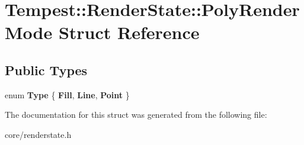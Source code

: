 \hypertarget{struct_tempest_1_1_render_state_1_1_poly_render_mode}{\section{Tempest\+:\+:Render\+State\+:\+:Poly\+Render\+Mode Struct Reference}
\label{struct_tempest_1_1_render_state_1_1_poly_render_mode}
}
\subsection*{Public Types}
\begin{DoxyCompactItemize}
\item 
\hypertarget{struct_tempest_1_1_render_state_1_1_poly_render_mode_a4479a2cf95c4b2295fd30c93667c7de5}{enum {\bfseries Type} \{ {\bfseries Fill}, 
{\bfseries Line}, 
{\bfseries Point}
 \}}\label{struct_tempest_1_1_render_state_1_1_poly_render_mode_a4479a2cf95c4b2295fd30c93667c7de5}

\end{DoxyCompactItemize}


The documentation for this struct was generated from the following file\+:\begin{DoxyCompactItemize}
\item 
core/renderstate.\+h\end{DoxyCompactItemize}
